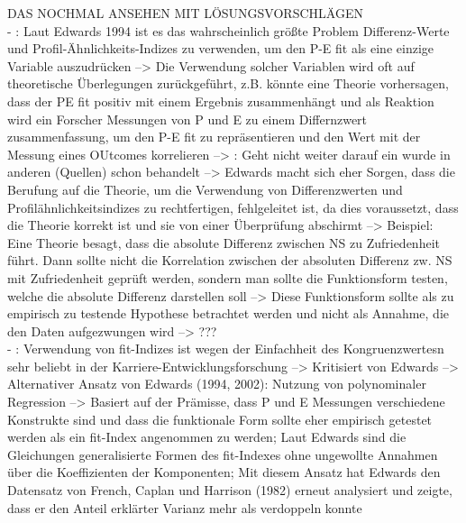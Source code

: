 DAS NOCHMAL ANSEHEN MIT LÖSUNGSVORSCHLÄGEN \\
- \cite[S. 55]{edwards:2008}: Laut Edwards 1994 ist es das wahrscheinlich größte Problem Differenz-Werte und Profil-Ähnlichkeits-Indizes zu verwenden, um den P-E fit als eine einzige Variable auszudrücken --> Die Verwendung solcher Variablen wird oft auf theoretische Überlegungen zurückgeführt, z.B. könnte eine Theorie vorhersagen, dass der PE fit positiv mit einem Ergebnis zusammenhängt und als Reaktion wird ein Forscher Messungen von P und E zu einem Differnzwert zusammenfassung, um den P-E fit zu repräsentieren und den Wert mit der Messung eines OUtcomes korrelieren --> \cite[S. 56]{edwards:2008}: Geht nicht weiter darauf ein wurde in anderen (Quellen) schon behandelt --> Edwards macht sich eher Sorgen, dass die Berufung auf die Theorie, um die Verwendung von Differenzwerten und Profilähnlichkeitsindizes zu rechtfertigen, fehlgeleitet ist, da dies voraussetzt, dass die Theorie korrekt ist und sie von einer Überprüfung abschirmt --> Beispiel: Eine Theorie besagt, dass die absolute Differenz zwischen NS zu Zufriedenheit führt. Dann sollte nicht die Korrelation zwischen der absoluten Differenz zw. NS mit Zufriedenheit geprüft werden, sondern man sollte die Funktionsform testen, welche die absolute Differenz darstellen soll --> Diese Funktionsform sollte als zu empirisch zu testende Hypothese betrachtet werden und nicht als Annahme, die den Daten aufgezwungen wird --> ??? \\
- \cite[S. 7]{su:2015}: Verwendung von fit-Indizes ist wegen der Einfachheit des Kongruenzwertesn sehr beliebt in der Karriere-Entwicklungsforschung --> Kritisiert von Edwards --> Alternativer Ansatz von Edwards (1994, 2002): Nutzung von polynominaler Regression --> Basiert auf der Prämisse, dass P und E Messungen verschiedene Konstrukte sind und dass die funktionale Form sollte eher empirisch getestet werden als ein fit-Index angenommen zu werden; Laut Edwards sind die Gleichungen generalisierte Formen des fit-Indexes ohne ungewollte Annahmen über die Koeffizienten der Komponenten; Mit diesem Ansatz hat Edwards den Datensatz von French, Caplan und Harrison (1982) erneut analysiert und zeigte, dass er den Anteil erklärter Varianz mehr als verdoppeln konnte

